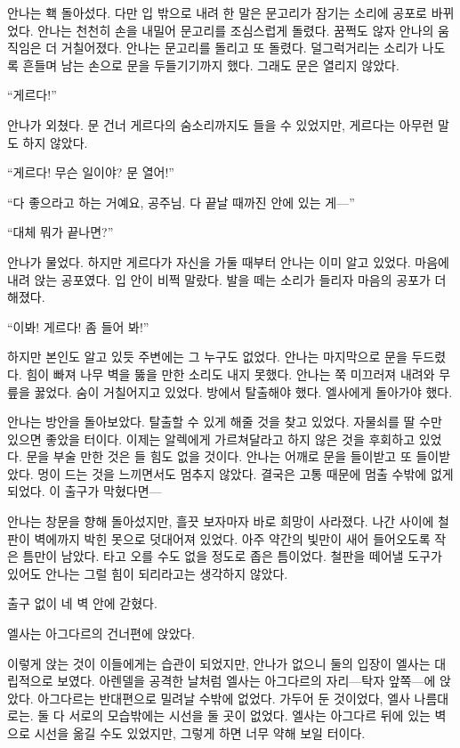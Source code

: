 안나는 홱 돌아섰다. 다만 입 밖으로 내려 한 말은 문고리가 잠기는 소리에 공포로 바뀌었다. 안나는 천천히 손을 내밀어 문고리를 조심스럽게 돌렸다. 꿈쩍도 않자 안나의 움직임은 더 거칠어졌다. 안나는 문고리를 돌리고 또 돌렸다. 덜그럭거리는 소리가 나도록 흔들며 남는 손으로 문을 두들기기까지 했다. 그래도 문은 열리지 않았다.

``게르다!''

안나가 외쳤다. 문 건너 게르다의 숨소리까지도 들을 수 있었지만, 게르다는 아무런 말도 하지 않았다.

``게르다! 무슨 일이야? 문 열어!''

``다 좋으라고 하는 거예요, 공주님. 다 끝날 때까진 안에 있는 게—''

``대체 뭐가 끝나면?''

안나가 물었다. 하지만 게르다가 자신을 가둘 때부터 안나는 이미 알고 있었다. 마음에 내려 앉는 공포였다. 입 안이 비쩍 말랐다. 발을 떼는 소리가 들리자 마음의 공포가 더해졌다.

``이봐! 게르다! 좀 들어 봐!''

하지만 본인도 알고 있듯 주변에는 그 누구도 없었다. 안나는 마지막으로 문을 두드렸다. 힘이 빠져 나무 벽을 뚫을 만한 소리도 내지 못했다. 안나는 쭉 미끄러져 내려와 무릎을 꿇었다. 숨이 거칠어지고 있었다. 방에서 탈출해야 했다. 엘사에게 돌아가야 했다.

안나는 방안을 돌아보았다. 탈출할 수 있게 해줄 것을 찾고 있었다. 자물쇠를 딸 수만 있으면 좋았을 터이다. 이제는 알렉에게 가르쳐달라고 하지 않은 것을 후회하고 있었다. 문을 부술 만한 것은 들 힘도 없을 것이다. 안나는 어깨로 문을 들이받고 또 들이받았다. 멍이 드는 것을 느끼면서도 멈추지 않았다. 결국은 고통 때문에 멈출 수밖에 없게 되었다. 이 출구가 막혔다면—

안나는 창문을 향해 돌아섰지만, 흘끗 보자마자 바로 희망이 사라졌다. 나간 사이에 철판이 벽에까지 박힌 못으로 덧대어져 있었다. 아주 약간의 빛만이 새어 들어오도록 작은 틈만이 남았다. 타고 오를 수도 없을 정도로 좁은 틈이었다. 철판을 떼어낼 도구가 있어도 안나는 그럴 힘이 되리라고는 생각하지 않았다.

출구 없이 네 벽 안에 갇혔다.

\textbreak

엘사는 아그다르의 건너편에 앉았다.

이렇게 앉는 것이 이들에게는 습관이 되었지만, 안나가 없으니 둘의 입장이 엘사는 대립적으로 보였다. 아렌델을 공격한 날처럼 엘사는 아그다르의 자리—탁자 앞쪽—에 앉았다. 아그다르는 반대편으로 밀려날 수밖에 없었다. 가두어 둔 것이었다, 엘사 나름대로는. 둘 다 서로의 모습밖에는 시선을 둘 곳이 없었다. 엘사는 아그다르 뒤에 있는 벽으로 시선을 옮길 수도 있었지만, 그렇게 하면 너무 약해 보일 터이다.

